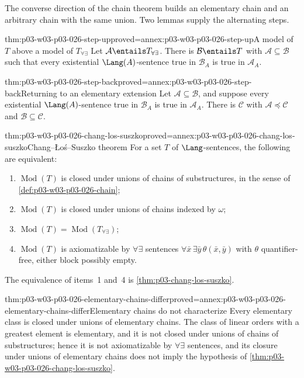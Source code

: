 The converse direction of the chain theorem builds an elementary chain and
an arbitrary chain with the same union.  Two lemmas supply the alternating
steps.

\begin{hblemma}{thm:p03-w03-p03-026-step-up}{proved=annex:p03-w03-p03-026-step-up}{A model of \(T\) above a model of \(T_{\forall\exists}\)}
Let \(\mathcal A\entails T_{\forall\exists}\).  There is
\(\mathcal B\entails T\) with \(\mathcal A\subseteq\mathcal B\) such that
every existential \(\Lang(A)\)-sentence true in \(\mathcal B_A\) is true in
\(\mathcal A_A\).
\end{hblemma}

\begin{hblemma}{thm:p03-w03-p03-026-step-back}{proved=annex:p03-w03-p03-026-step-back}{Returning to an elementary extension}
Let \(\mathcal A\subseteq\mathcal B\), and suppose every existential
\(\Lang(A)\)-sentence true in \(\mathcal B_A\) is true in \(\mathcal A_A\).
There is \(\mathcal C\) with \(\mathcal A\preccurlyeq\mathcal C\) and
\(\mathcal B\subseteq\mathcal C\).
\end{hblemma}

\begin{hbtheorem}{thm:p03-w03-p03-026-chang-los-suszko}{proved=annex:p03-w03-p03-026-chang-los-suszko}{Chang--\L o\'s--Suszko theorem}
For a set \(T\) of \(\Lang\)-sentences, the following are equivalent:
\begin{enumerate}
 \item \(\operatorname{Mod}(T)\) is closed under unions of chains of
       substructures, in the sense of \cref{def:p03-w03-p03-026-chain};
 \item \(\operatorname{Mod}(T)\) is closed under unions of chains indexed
       by \(\omega\);
 \item \(\operatorname{Mod}(T)=\operatorname{Mod}(T_{\forall\exists})\);
 \item \(\operatorname{Mod}(T)\) is axiomatizable by \(\forall\exists\)
       sentences \(\forall\bar x\,\exists\bar y\,\theta(\bar x,\bar y)\)
       with \(\theta\) quantifier-free, either block possibly empty.
\end{enumerate}
The equivalence of items~1 and~4 is \cref{thm:p03-chang-los-suszko}.
\end{hbtheorem}

\begin{hbtheorem}{thm:p03-w03-p03-026-elementary-chains-differ}{proved=annex:p03-w03-p03-026-elementary-chains-differ}{Elementary chains do not characterize}
Every elementary class is closed under unions of elementary chains.  The
class of linear orders with a greatest element is elementary, and it is not
closed under unions of chains of substructures; hence it is not
axiomatizable by \(\forall\exists\) sentences, and its closure under unions
of elementary chains does not imply the hypothesis of
\cref{thm:p03-w03-p03-026-chang-los-suszko}.
\end{hbtheorem}

